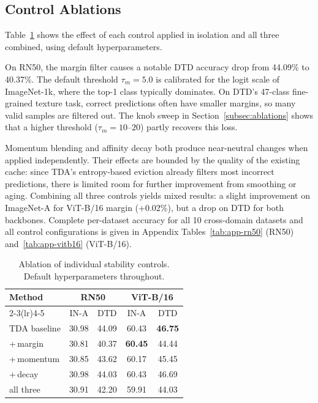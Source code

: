 \documentclass[10pt,twocolumn,letterpaper]{article}
\newcommand{\best}[1]{\textbf{#1}}
\begin{document}
\subsection{Control Ablations}
\label{subsec:controls}

Table~\ref{tab:controls} shows the effect of each control applied
in isolation and all three combined, using default hyperparameters.

On RN50, the margin filter causes a notable DTD accuracy drop from
44.09\% to 40.37\%.
The default threshold $\tau_m{=}5.0$ is calibrated for the logit
scale of ImageNet-1k, where the top-1 class typically dominates.
On DTD's 47-class fine-grained texture task, correct predictions
often have smaller margins, so many valid samples are filtered out.
The knob sweep in Section~\ref{subsec:ablations} shows that a
higher threshold ($\tau_m{=}10$--$20$) partly recovers this loss.

Momentum blending and affinity decay both produce near-neutral changes
when applied independently.
Their effects are bounded by the quality of the existing cache:
since TDA's entropy-based eviction already filters most incorrect
predictions, there is limited room for further improvement from
smoothing or aging.
Combining all three controls yields mixed results: a slight
improvement on ImageNet-A for ViT-B/16 margin (+0.02\%), but
a drop on DTD for both backbones.
Complete per-dataset accuracy for all 10 cross-domain datasets and
all control configurations is given in Appendix
Tables~\ref{tab:app-rn50} (RN50) and~\ref{tab:app-vitb16} (ViT-B/16).

\begin{table}[t]
\centering\small\setlength{\tabcolsep}{4pt}
\caption{Ablation of individual stability controls.
  Default hyperparameters throughout.}
\label{tab:controls}
\begin{tabular}{lcccc}
\toprule
Method & \multicolumn{2}{c}{RN50} & \multicolumn{2}{c}{ViT-B/16} \\
\cmidrule(lr){2-3}\cmidrule(lr){4-5}
 & IN-A & DTD & IN-A & DTD \\
\midrule
TDA baseline & 30.98 & 44.09 & 60.43 & \best{46.75} \\
+\,margin    & 30.81 & 40.37 & \best{60.45} & 44.44 \\
+\,momentum  & 30.85 & 43.62 & 60.17 & 45.45 \\
+\,decay     & 30.98 & 44.03 & 60.43 & 46.69 \\
all three    & 30.91 & 42.20 & 59.91 & 44.03 \\
\bottomrule
\end{tabular}
\end{table}
\end{document}
